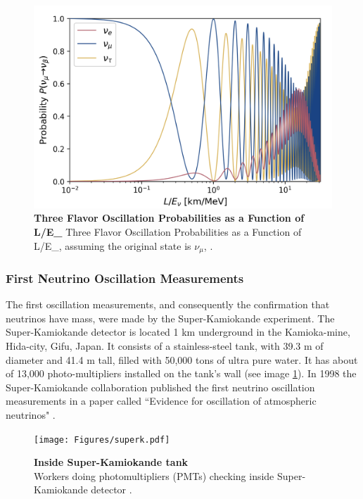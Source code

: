 \begin{figure}
	\begin{center}
		\includegraphics[scale=1]{Figures/three_flavor_osc.jpg}
		\caption[Three Flavor Oscillation Model]{\textbf{Three Flavor Oscillation Probabilities as a Function of L/E_{\nu}} Three Flavor Oscillation Probabilities as a Function of L/E_{\nu}, assuming the original state is $\nu_{\mu}$, \cite{Lauren_thesis}.}
	\end{center}
\end{figure}

\subsubsection{First Neutrino Oscillation Measurements}
The first oscillation measurements, and consequently the confirmation that neutrinos have mass, were made by the Super-Kamiokande experiment. The Super-Kamiokande detector is located 1 km underground in the Kamioka-mine, Hida-city, Gifu, Japan. It consists of a stainless-steel tank, with 39.3 m of diameter and 41.4 m tall, filled with 50,000 tons of ultra pure water. It has about of 13,000 photo-multipliers installed on the tank's wall (see image \ref{superk_picture}).
In 1998 the Super-Kamiokande collaboration published the first neutrino oscillation measurements in a paper called ``Evidence for oscillation of atmospheric neutrinos" \cite{first_kamioka_measure}.
%
\begin{figure}
	\begin{center}
		\texttt{[image: Figures/superk.pdf]}
		\caption[Inside Super-Kamiokande tank]{ {\textbf{Inside Super-Kamiokande tank}}\\Workers doing photomultipliers (PMTs) checking inside Super-Kamiokande detector \cite{superk_picture}.}
		\label{superk_picture}	
	\end{center}
\end{figure}
%

